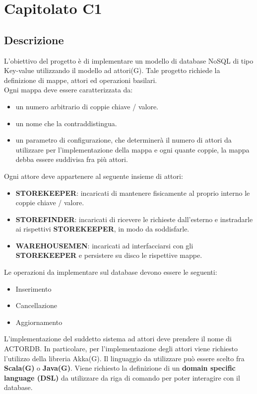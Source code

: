 \newpage
\section{Capitolato C1}
\subsection{Descrizione}
L'obiettivo del progetto è di implementare un modello di database NoSQL di tipo Key-value utilizzando il modello ad attori(G).
Tale progetto richiede la definizione di mappe, attori ed operazioni basilari. 
\\Ogni mappa deve essere caratterizzata da:
\begin{itemize}
\item
un numero arbitrario di coppie chiave / valore. 
\item 
un nome che la contraddistingua. 
\item
un parametro di configurazione, che determinerà il numero di attori da utilizzare per l'implementazione della mappa e ogni quante coppie, la mappa debba essere suddivisa fra più attori.
\end{itemize}
Ogni attore deve appartenere al seguente insieme di attori:
\begin{itemize}
\item
\textbf{STOREKEEPER}: incaricati di mantenere fisicamente al proprio interno le coppie chiave / valore.
\item
\textbf{STOREFINDER}: incaricati di ricevere le richieste dall’esterno e instradarle ai 
rispettivi \textbf{STOREKEEPER}, in modo da soddisfarle. 
\item
\textbf{WAREHOUSEMEN}: incaricati ad interfacciarsi con gli \textbf{STOREKEEPER} e persistere su disco le rispettive mappe.
\end{itemize}

Le operazioni da implementare sul database devono essere le seguenti: 
\begin{itemize}
\item
Inserimento
\item
Cancellazione 
\item
Aggiornamento 
\end{itemize}

L'implementazione del suddetto sistema ad attori deve prendere il nome di ACTORDB. In particolare, per l'implementazione degli attori viene richiesto l'utilizzo della libreria Akka(G).
Il linguaggio da utilizzare può essere scelto fra \textbf{Scala(G)} o \textbf{Java(G)}. 
Viene richiesto la definizione di un \textbf{domain specific language (DSL)} da utilizzare da riga di comando per poter interagire con il database.

